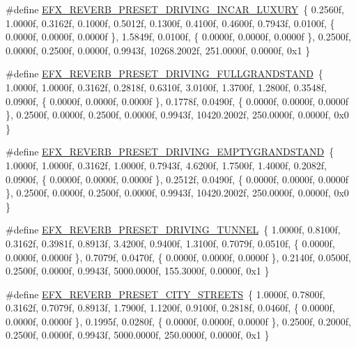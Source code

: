 \begin{DoxyCompactItemize}
\item 
\#define \mbox{\hyperlink{efx-presets_8h_a0293b34a2488fe018f03138c9ebe391f}{E\+F\+X\+\_\+\+R\+E\+V\+E\+R\+B\+\_\+\+P\+R\+E\+S\+E\+T\+\_\+\+D\+R\+I\+V\+I\+N\+G\+\_\+\+I\+N\+C\+A\+R\+\_\+\+L\+U\+X\+U\+RY}}~\{ 0.\+2560f, 1.\+0000f, 0.\+3162f, 0.\+1000f, 0.\+5012f, 0.\+1300f, 0.\+4100f, 0.\+4600f, 0.\+7943f, 0.\+0100f, \{ 0.\+0000f, 0.\+0000f, 0.\+0000f \}, 1.\+5849f, 0.\+0100f, \{ 0.\+0000f, 0.\+0000f, 0.\+0000f \}, 0.\+2500f, 0.\+0000f, 0.\+2500f, 0.\+0000f, 0.\+9943f, 10268.\+2002f, 251.\+0000f, 0.\+0000f, 0x1 \}
\item 
\#define \mbox{\hyperlink{efx-presets_8h_a73de691b5ec4544039c8e61c175d35fc}{E\+F\+X\+\_\+\+R\+E\+V\+E\+R\+B\+\_\+\+P\+R\+E\+S\+E\+T\+\_\+\+D\+R\+I\+V\+I\+N\+G\+\_\+\+F\+U\+L\+L\+G\+R\+A\+N\+D\+S\+T\+A\+ND}}~\{ 1.\+0000f, 1.\+0000f, 0.\+3162f, 0.\+2818f, 0.\+6310f, 3.\+0100f, 1.\+3700f, 1.\+2800f, 0.\+3548f, 0.\+0900f, \{ 0.\+0000f, 0.\+0000f, 0.\+0000f \}, 0.\+1778f, 0.\+0490f, \{ 0.\+0000f, 0.\+0000f, 0.\+0000f \}, 0.\+2500f, 0.\+0000f, 0.\+2500f, 0.\+0000f, 0.\+9943f, 10420.\+2002f, 250.\+0000f, 0.\+0000f, 0x0 \}
\item 
\#define \mbox{\hyperlink{efx-presets_8h_abf3d74db7c07cfbe62e57ac41933fe16}{E\+F\+X\+\_\+\+R\+E\+V\+E\+R\+B\+\_\+\+P\+R\+E\+S\+E\+T\+\_\+\+D\+R\+I\+V\+I\+N\+G\+\_\+\+E\+M\+P\+T\+Y\+G\+R\+A\+N\+D\+S\+T\+A\+ND}}~\{ 1.\+0000f, 1.\+0000f, 0.\+3162f, 1.\+0000f, 0.\+7943f, 4.\+6200f, 1.\+7500f, 1.\+4000f, 0.\+2082f, 0.\+0900f, \{ 0.\+0000f, 0.\+0000f, 0.\+0000f \}, 0.\+2512f, 0.\+0490f, \{ 0.\+0000f, 0.\+0000f, 0.\+0000f \}, 0.\+2500f, 0.\+0000f, 0.\+2500f, 0.\+0000f, 0.\+9943f, 10420.\+2002f, 250.\+0000f, 0.\+0000f, 0x0 \}
\item 
\#define \mbox{\hyperlink{efx-presets_8h_abdc865e490c2ea43f97a7c2db574f917}{E\+F\+X\+\_\+\+R\+E\+V\+E\+R\+B\+\_\+\+P\+R\+E\+S\+E\+T\+\_\+\+D\+R\+I\+V\+I\+N\+G\+\_\+\+T\+U\+N\+N\+EL}}~\{ 1.\+0000f, 0.\+8100f, 0.\+3162f, 0.\+3981f, 0.\+8913f, 3.\+4200f, 0.\+9400f, 1.\+3100f, 0.\+7079f, 0.\+0510f, \{ 0.\+0000f, 0.\+0000f, 0.\+0000f \}, 0.\+7079f, 0.\+0470f, \{ 0.\+0000f, 0.\+0000f, 0.\+0000f \}, 0.\+2140f, 0.\+0500f, 0.\+2500f, 0.\+0000f, 0.\+9943f, 5000.\+0000f, 155.\+3000f, 0.\+0000f, 0x1 \}
\item 
\#define \mbox{\hyperlink{efx-presets_8h_ad152b664c7db3b0dd8ab1757bed252af}{E\+F\+X\+\_\+\+R\+E\+V\+E\+R\+B\+\_\+\+P\+R\+E\+S\+E\+T\+\_\+\+C\+I\+T\+Y\+\_\+\+S\+T\+R\+E\+E\+TS}}~\{ 1.\+0000f, 0.\+7800f, 0.\+3162f, 0.\+7079f, 0.\+8913f, 1.\+7900f, 1.\+1200f, 0.\+9100f, 0.\+2818f, 0.\+0460f, \{ 0.\+0000f, 0.\+0000f, 0.\+0000f \}, 0.\+1995f, 0.\+0280f, \{ 0.\+0000f, 0.\+0000f, 0.\+0000f \}, 0.\+2500f, 0.\+2000f, 0.\+2500f, 0.\+0000f, 0.\+9943f, 5000.\+0000f, 250.\+0000f, 0.\+0000f, 0x1 \}

\end{DoxyCompactItemize}

